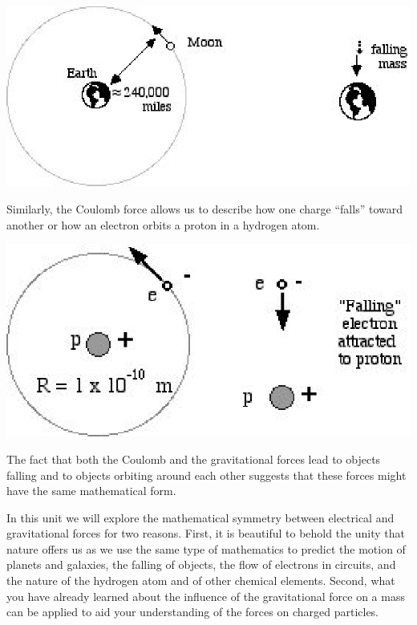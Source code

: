 \vspace{0.3cm}
{\par\centering \includegraphics{elec_grav_fig1.eps} \par}
\vspace{0.3cm}

Similarly, the Coulomb force allows us to describe how one charge ``falls''
toward another or how an electron orbits a proton in a hydrogen atom. 

\vspace{0.3cm}
{\par\centering \includegraphics{elec_grav_fig2.eps} \par}
\vspace{0.3cm}

The fact that both the Coulomb and the gravitational forces lead to objects
falling and to objects orbiting around each other suggests that these forces
might have the same mathematical form. 

In this unit we will explore the mathematical symmetry between electrical and
gravitational forces for two reasons. First, it is beautiful to behold the unity
that nature offers us as we use the same type of mathematics to predict the
motion of planets and galaxies, the falling of objects, the flow of electrons
in circuits, and the nature of the hydrogen atom and of other chemical elements.
Second, what you have already learned about the influence of the gravitational
force on a mass can be applied to aid your understanding of the forces on charged
particles. 

